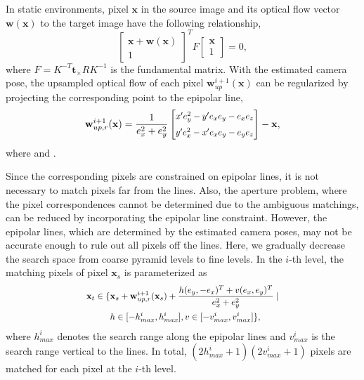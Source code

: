 \documentclass[letterpaper, 10 pt, conference]{ieeeconf}  %
\begin{document}
In static environments, pixel $\mathbf{x}$ in the source image and its optical flow vector $\mathbf{w}(\mathbf{x})$ to the target image have the following relationship,
\begin{equation}
\begin{bmatrix} \mathbf{x}  + \mathbf{w}(\mathbf{x}) \\ 1 \end{bmatrix}^T F \begin{bmatrix} \mathbf{x} \\ 1 \end{bmatrix} = 0,
\end{equation}
where $F = K^{-T} \mathbf{t}_\times R K^{-1}$ is the fundamental matrix. With the estimated camera pose, the upsampled optical flow of each pixel $\mathbf{w}^{i+1}_{up}(\mathbf{x})$ can be regularized by projecting the corresponding point to the epipolar line,
\begin{equation}
\mathbf{w}^{i+1}_{up,r}(\mathbf{x}) = \frac{1}{e_x^2+e_y^2}
\begin{bmatrix} 
\scalebox{0.9}{$x' e_y^2 - y' e_x e_y - e_x e_z$} \\[0.15cm]
\scalebox{0.9}{$y' e_x^2 - x' e_x e_y - e_y e_z$}
\end{bmatrix} - \mathbf{x},
\end{equation}
where  and .
 
Since the corresponding pixels are constrained on epipolar lines, it is not necessary to match pixels far from the lines. Also, the aperture problem, where the pixel correspondences cannot be determined due to the ambiguous matchings, can be reduced by incorporating the epipolar line constraint. However, the epipolar lines, which are determined by the estimated camera poses, may not be accurate enough to rule out all pixels off the lines. Here, we gradually decrease the search space from coarse pyramid levels to fine levels. In the $i$-th level, the matching pixels of pixel $\mathbf{x}_s$ is parameterized as 
\begin{equation}
\scalebox{0.9}{$
\begin{aligned}
\mathbf{x}_t \in \{ & \mathbf{x}_s + \mathbf{w}^{i+1}_{up,r}(\mathbf{x}_s) + \frac{h(e_y,-e_x)^T + v(e_x,e_y)^T}{e_x^2 + e_y^2} \mid \\ 
& h \in [-h_{max}^i,h_{max}^i], v \in [-v_{max}^i, v_{max}^i]\},
\end{aligned}$}
\end{equation}
where $h_{max}^i$ denotes the search range along the epipolar lines and $v_{max}^i$ is the search range vertical to the lines. In total, $(2h_{max}^i+1)(2v_{max}^i+1)$ pixels are matched for each pixel at the $i$-th level.
 
\end{document}
